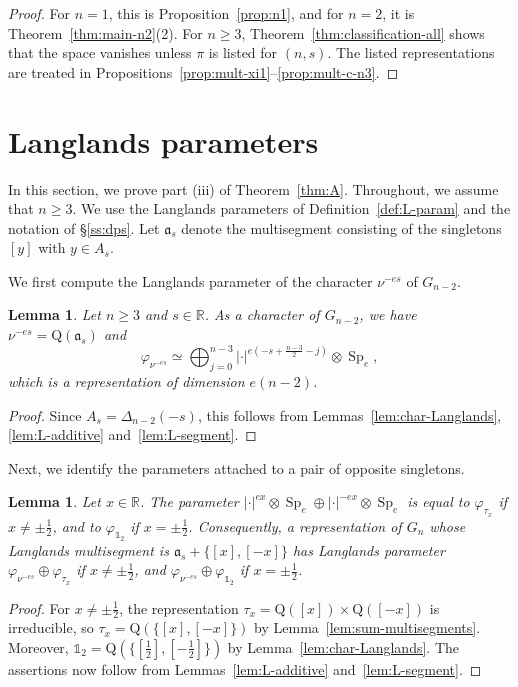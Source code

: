 \documentclass[11pt]{amsart}
\numberwithin{equation}{section}
\theoremstyle{plain}
\newtheorem{lemma}[theorem]{Lemma}
\theoremstyle{definition}
\theoremstyle{remark}
\newcommand{\R}{\mathbb{R}}
\newcommand{\one}{\mathds{1}}
\DeclareMathOperator{\Sp}{Sp}
\newcommand{\aaa}{\mathfrak{a}}
\newcommand{\Qq}{\mathrm{Q}}
\begin{document}
\begin{proof}
	For $n=1$, this is Proposition~\ref{prop:n1}, and for $n=2$, it is Theorem~\ref{thm:main-n2}(2). For $n\ge3$, Theorem~\ref{thm:classification-all} shows that the space vanishes unless $\pi$ is listed for $(n,s)$. The listed representations are treated in Propositions~\ref{prop:mult-xi1}--\ref{prop:mult-c-n3}.
\end{proof}

\section{Langlands parameters}\label{sec:langlands}

In this section, we prove part (iii) of Theorem~\ref{thm:A}. Throughout, we assume that $n\ge3$. We use the Langlands parameters of Definition~\ref{def:L-param} and the notation of \S\ref{ss:dps}. Let $\aaa_s$ denote the multisegment consisting of the singletons $[y]$ with $y\in A_s$.

We first compute the Langlands parameter of the character $\nu^{-es}$ of $G_{n-2}$.

\begin{lemma}\label{lem:L-nu-es}
	Let $n\ge3$ and $s\in\R$. As a character of $G_{n-2}$, we have $\nu^{-es}=\Qq(\aaa_s)$ and
	$$\varphi_{\nu^{-es}}\simeq\bigoplus_{j=0}^{n-3}|\cdot|^{e(-s+\frac{n-3}2-j)}\otimes\Sp_e,
	$$
	which is a representation of dimension $e(n-2)$.
\end{lemma}

\begin{proof}
	Since $A_s=\Delta_{n-2}(-s)$, this follows from Lemmas~\ref{lem:char-Langlands}, \ref{lem:L-additive} and~\ref{lem:L-segment}.
\end{proof}

Next, we identify the parameters attached to a pair of opposite singletons.

\begin{lemma}\label{lem:L-two-singletons}
	Let $x\in\R$. The parameter $|\cdot|^{ex}\otimes\Sp_e\oplus|\cdot|^{-ex}\otimes\Sp_e$ is equal to $\varphi_{\tau_x}$ if $x\ne\pm\frac12$, and to $\varphi_{\one_2}$ if $x=\pm\frac12$. Consequently, a representation of $G_n$ whose Langlands multisegment is $\aaa_s+\{[x],[-x]\}$ has Langlands parameter $\varphi_{\nu^{-es}}\oplus\varphi_{\tau_x}$ if $x\ne\pm\frac12$, and $\varphi_{\nu^{-es}}\oplus\varphi_{\one_2}$ if $x=\pm\frac12$.
\end{lemma}

\begin{proof}
	For $x\ne\pm\frac12$, the representation $\tau_x=\Qq([x])\times\Qq([-x])$ is irreducible, so $\tau_x=\Qq(\{[x],[-x]\})$ by Lemma~\ref{lem:sum-multisegments}. Moreover, $\one_2=\Qq(\{[\frac12],[-\frac12]\})$ by Lemma~\ref{lem:char-Langlands}. The assertions now follow from Lemmas~\ref{lem:L-additive} and~\ref{lem:L-segment}.
\end{proof}
\end{document}
